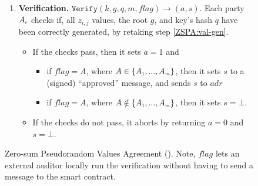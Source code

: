 \begin{figure}[ht]
\begin{center}
\begin{tcolorbox}[enhanced,width=3.3in, height=94mm,right=.5mm,
    drop fuzzy shadow southwest,
    colframe=black,colback=white]
{\begin{enumerate}[leftmargin=-.2mm]
\begin{enumerate}
\item sends the tree's root: $g$,   and the key's hash: $q=\mathtt {H}(k)$ to $adr$. 

\end{enumerate}

\item\label{ZSPA:verify}{\textbf{Verification.} $\mathtt{Verify}(k, g, q, m, flag)\rightarrow (a, s)$}. 
%
Each party $A_{\scriptscriptstyle t}$ checks if, all $z_{\scriptscriptstyle i,j}$ values, the root $g$, and key's hash $q$ have been correctly generated, by retaking  step \ref{ZSPA:val-gen}. 
%
\begin{itemize}
\item If the checks pass, then it sets $a=1$ and
\begin{itemize}
\item if $flag=A$, where $A\in \{    A_{\scriptscriptstyle 1},...,  A_{\scriptscriptstyle m}\}$, then  it sets $s$ to a (signed) ``approved'' message, and sends $s$ to $adr$
\item  if $flag= A$, where $A\notin \{    A_{\scriptscriptstyle 1},...,  A_{\scriptscriptstyle m}\}$, then it sets $s = \bot$. 
\end{itemize}
\item If the checks do not pass, it aborts by returning $a=0$ and $s = \bot$. 
\end{itemize}
%
 \end{enumerate}
}
 \end{tcolorbox}
\end{center}
\vspace{-3mm}
\caption{Zero-sum Pseudorandom Values Agreement (\zspa). Note, $flag$ lets an external auditor locally run the verification without having to send a message to the smart contract.} 
\label{fig:ZSPA}
\vspace{-2mm}
\end{figure}

